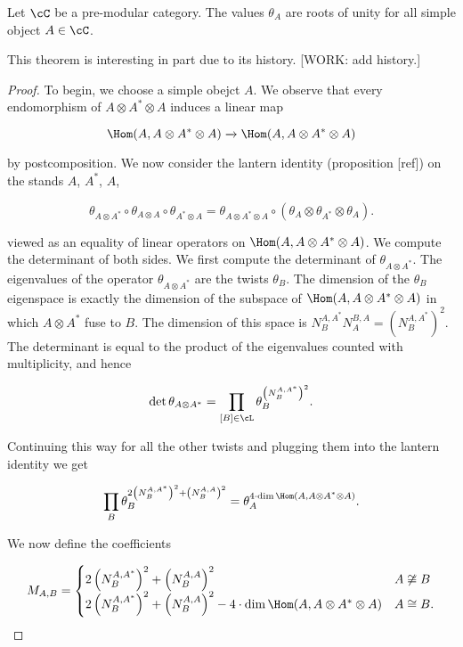 \begin{thrm}[Vafa] Let $\cC$ be a pre-modular category. The values $\theta_{A}$ are roots of unity for all simple object $A\in \cC$.
\end{thrm}
\begin{rem} This theorem is interesting in part due to its history. [WORK: add history.]
\end{rem}
\begin{proof} To begin, we choose a simple obejct $A$. We observe that every endomorphism of $A\otimes A^*\otimes A$ induces a linear map

$$\Hom(A,A\otimes A^*\otimes A) \xrightarrow{} \Hom(A,A\otimes A^*\otimes A)$$

by postcomposition. We now consider the lantern identity (proposition [ref]) on the stands $A$, $A^*$, $A$,

$$\theta_{A\otimes A^*}\circ \theta_{A\otimes A}\circ \theta_{A^*\otimes A} = \theta_{A\otimes A^*\otimes A}\circ (\theta_{A}\otimes \theta_{A^*}\otimes \theta_{A}).$$

viewed as an equality of linear operators on $\Hom(A,A\otimes A^*\otimes A)$. We compute the determinant of both sides. We first compute the determinant of $\theta_{A\otimes A^*}$. The eigenvalues of the operator $\theta_{A\otimes A^*}$ are the twists $\theta_{B}$. The dimension of the $\theta_{B}$ eigenspace is exactly the dimension of the subspace of $\Hom(A,A\otimes A^*\otimes A)$ in which $A\otimes A^*$ fuse to $B$. The dimension of this space is $N^{A,A^*}_{B}N^{B,A}_{A}=(N^{A,A^*}_{B})^2$. The determinant is equal to the product of the eigenvalues counted with multiplicity, and hence

$$\det \theta_{A\otimes A^*}= \prod_{[B]\in \cL}\theta_{B}^{\left(N^{A,A^*}_{B}\right)^2}.$$

Continuing this way for all the other twists and plugging them into the lantern identity we get

$$\prod_{B}\theta_{B}^{2\left(N^{A,A^*}_{B}\right)^2+\left(N^{A,A}_{B}\right)^2}=\theta_{A}^{4\cdot \dim \Hom(A,A\otimes A^*\otimes A)}.$$

We now define the coefficients

$$
M_{A,B}=
\begin{cases}
2\left(N^{A,A^*}_{B}\right)^2+\left(N^{A,A}_{B}\right)^2 & A\not\cong B\\
2\left(N^{A,A^*}_{B}\right)^2+\left(N^{A,A}_{B}\right)^2 - 4\cdot \dim \Hom(A,A\otimes A^*\otimes A) & A\cong B.
\end{cases}
$$


\end{proof}
